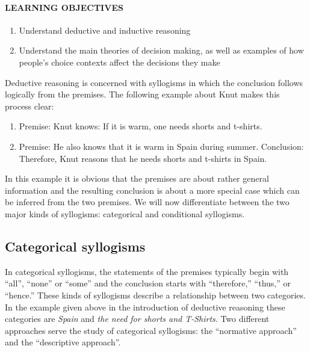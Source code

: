 \documentclass[
]{krantz}
\providecommand{\tightlist}{%
  \setlength{\itemsep}{0pt}\setlength{\parskip}{0pt}}
\begin{document}
\hypertarget{learning-objectives-8}{%
\paragraph*{LEARNING OBJECTIVES}\label{learning-objectives-8}}

\begin{enumerate}
\def\labelenumi{\arabic{enumi}.}
\tightlist
\item
  Understand deductive and inductive reasoning
\item
  Understand the main theories of decision making, as well as examples of how people's choice contexts affect the decisions they make
\end{enumerate}

Deductive reasoning is concerned with syllogisms in which the conclusion follows logically from the premises. The following example about Knut makes this process clear:

\begin{enumerate}
\def\labelenumi{\arabic{enumi}.}
\tightlist
\item
  Premise: Knut knows: If it is warm, one needs shorts and t-shirts.
\item
  Premise: He also knows that it is warm in Spain during summer.
  Conclusion: Therefore, Knut reasons that he needs shorts and t-shirts in Spain.
\end{enumerate}

In this example it is obvious that the premises are about rather general information and the resulting conclusion is about a more special case which can be inferred from the two premises. We will now differentiate between the two major kinds of syllogisms: categorical and conditional syllogisms.

\hypertarget{categorical-syllogisms}{%
\subsection*{Categorical syllogisms}\label{categorical-syllogisms}}


In categorical syllogisms, the statements of the premises typically begin with ``all'', ``none'' or ``some'' and the conclusion starts with ``therefore,'' ``thus,'' or ``hence.'' These kinds of syllogisms describe a relationship between two categories. In the example given above in the introduction of deductive reasoning these categories are \emph{Spain} and \emph{the need for shorts and T-Shirts}. Two different approaches serve the study of categorical syllogisms: the ``normative approach'' and the ``descriptive approach''.
\end{document}
